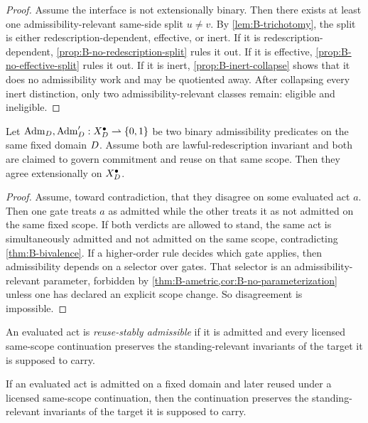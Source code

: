 \begin{proof}
Assume the interface is not extensionally binary. Then there exists at least one admissibility-relevant same-side split $u\neq v$. By \cref{lem:B-trichotomy}, the split is either redescription-dependent, effective, or inert. If it is redescription-dependent, \cref{prop:B-no-redescription-split} rules it out. If it is effective, \cref{prop:B-no-effective-split} rules it out. If it is inert, \cref{prop:B-inert-collapse} shows that it does no admissibility work and may be quotiented away. After collapsing every inert distinction, only two admissibility-relevant classes remain: eligible and ineligible.
\end{proof}

\begin{corollary}
\label{cor:B-unique-gate}
Let $\mathrm{Adm}_D,\mathrm{Adm}'_D:X_D^{\bullet}\rightharpoonup \{0,1\}$ be two binary admissibility predicates on the same fixed domain $D$. Assume both are lawful-redescription invariant and both are claimed to govern commitment and reuse on that same scope. Then they agree extensionally on $X_D^{\bullet}$.
\end{corollary}

\begin{proof}
Assume, toward contradiction, that they disagree on some evaluated act $a$. Then one gate treats $a$ as admitted while the other treats it as not admitted on the same fixed scope. If both verdicts are allowed to stand, the same act is simultaneously admitted and not admitted on the same scope, contradicting \cref{thm:B-bivalence}. If a higher-order rule decides which gate applies, then admissibility depends on a selector over gates. That selector is an admissibility-relevant parameter, forbidden by \cref{thm:B-ametric,cor:B-no-parameterization} unless one has declared an explicit scope change. So disagreement is impossible.
\end{proof}

\begin{definition}
An evaluated act is \emph{reuse-stably admissible} if it is admitted and every licensed same-scope continuation preserves the standing-relevant invariants of the target it is supposed to carry.
\end{definition}

\begin{proposition}
\label{prop:B-preserve-invariants}
If an evaluated act is admitted on a fixed domain and later reused under a licensed same-scope continuation, then the continuation preserves the standing-relevant invariants of the target it is supposed to carry.
\end{proposition}


